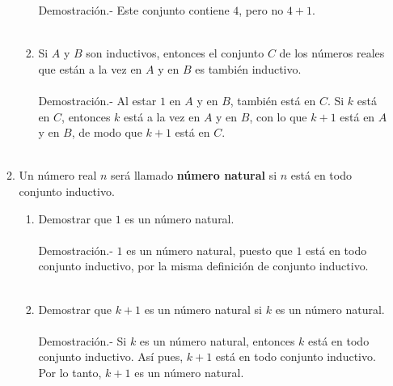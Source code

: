 \begin{enumerate}
\begin{enumerate}[\bfseries (a)]
\begin{enumerate}[\bfseries (i)]
                      Demostración.-\; Este conjunto contiene $4$, pero no $4+1$.\\\\
                   \item Si $A$ y $B$ son inductivos, entonces el conjunto $C$ de los números reales que están a la vez en $A$ y en $B$ es también inductivo.\\\\
                      Demostración.-\; Al estar $1$ en $A$ y en $B$, también está en $C$. Si $k$ está en $C$, entonces $k$ está a la vez en $A$ y en $B$, con lo que $k+1$ está en $A$ y en $B$, de modo que $k+1$ está en $C$.\\\\
                \end{enumerate}

             \item Un número real $n$ será llamado \textbf{número natural} si $n$ está en todo conjunto inductivo.
                \begin{enumerate}[\bfseries (i)]
                   \item Demostrar que $1$ es un número natural.\\\\
                      Demostración.-\; $1$ es un número natural, puesto que $1$ está en todo conjunto inductivo, por la misma definición de conjunto inductivo.\\\\

                   \item Demostrar que $k+1$ es un  número natural si $k$ es un número natural.\\\\
                      Demostración.-\; Si $k$ es un número natural, entonces $k$ está en todo conjunto inductivo. Así pues, $k+1$ está en todo conjunto inductivo. Por lo tanto, $k+1$ es un número natural.\\\\
                \end{enumerate}
          \end{enumerate}


\end{enumerate}
